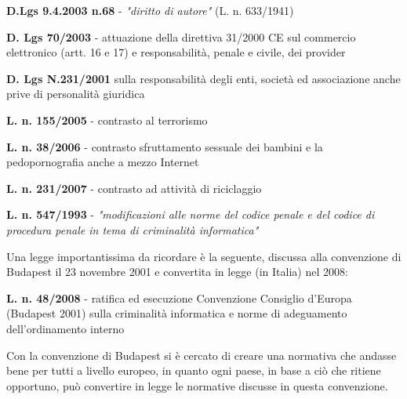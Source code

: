 \vspace{5mm}

\textbf{D.Lgs 9.4.2003 n.68} - \textit{"diritto di autore"} (L. n. 633/1941)

\vspace{5mm}

\textbf{D. Lgs 70/2003} - attuazione della direttiva 31/2000 CE sul commercio elettronico (artt. 16 e 17) e responsabilità, penale e civile, dei provider

\vspace{5mm}

\textbf{D. Lgs N.231/2001} sulla responsabilità degli enti, società ed associazione anche prive di personalità giuridica

\vspace{5mm}

\textbf{L. n. 155/2005} - contrasto al terrorismo

\vspace{5mm}

\textbf{L. n. 38/2006} - contrasto sfruttamento sessuale dei bambini e la pedopornografia anche a mezzo Internet

\vspace{5mm}

\textbf{L. n. 231/2007} - contrasto ad attività di riciclaggio

\vspace{5mm}

\textbf{L. n. 547/1993} - \textit{"modificazioni alle norme del codice penale e del codice di procedura penale in tema di criminalità informatica"}

\vspace{5mm}

Una legge importantissima da ricordare è la seguente, discussa alla convenzione di Budapest il 23 novembre 2001 e convertita in legge (in Italia) nel 2008:

\vspace{5mm}

\textbf{L. n. 48/2008} - ratifica ed esecuzione Convenzione Consiglio d'Europa (Budapest 2001) sulla criminalità informatica e norme di adeguamento dell'ordinamento interno

\vspace{5mm}

Con la convenzione di Budapest si è cercato di creare una normativa che andasse bene per tutti a livello europeo, in quanto ogni paese, in base a ciò che ritiene opportuno, può convertire in legge le normative discusse in questa convenzione.

